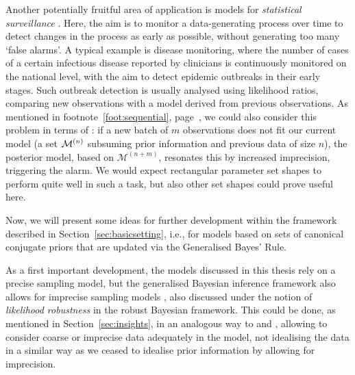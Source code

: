 Another potentially fruitful area of application is models for \emph{statistical surveillance}
\parencite[for a brief overview see, e.g.,][]{2011:IESS-surveillance}.
Here, the aim is to monitor a data-generating process over time
to detect changes in the process as early as possible,
without generating too many `false alarms'.
A typical example is disease monitoring,
where the number of cases of a certain infectious disease reported by clinicians
is continuously monitored on the national level,
with the aim to detect epidemic outbreaks in their early stages.
Such outbreak detection is usually analysed using likelihood ratios,
comparing new observations with a model derived from previous observations. 
As mentioned in footnote~\ref{foot:sequential}, page~\pageref{foot:sequential},
we could also consider this problem in terms of \pdc:
if a new batch of $m$ observations does not fit our current model
(a set $\mathcal{M}^{(n)}$ subsuming prior information and previous data of size $n$),
the posterior model, based on $\mathcal{M}^{(n+m)}$, resonates this by increased imprecision,
triggering the alarm.
We would expect rectangular parameter set shapes to perform quite well in such a task,
but also other set shapes could prove useful here.

\medskip

Now, we will present some ideas for further development within the framework
described in Section~\ref{sec:basicsetting}, i.e.,
for models based on sets of canonical conjugate priors
that are updated via the Generalised Bayes' Rule.

As a first important development,
the models discussed in this thesis rely on a precise sampling model,
but the generalised Bayesian inference framework also allows for imprecise sampling models
\parencite[see, in particular,][\S 8.5]{1991:walley},
also discussed under the notion of \emph{likelihood robustness} \parencite[e.g.,][]{2000:shyamalkumar} in the robust Bayesian framework.
This could be done, as mentioned in Section~\ref{sec:insights},
in an analogous way to \textcite{2007:utkinaugustin} and \textcite{2009:Troffaes:Coolen},
allowing to consider coarse or imprecise data adequately in the model,
not idealising the data in a similar way as we ceased to idealise prior information by allowing for imprecision.

